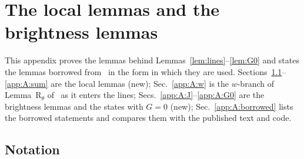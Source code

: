 \section{The local lemmas and the brightness lemmas}
\label{app:A}

This appendix proves the lemmas behind Lemmas~\ref{lem:lines}--\ref{lem:G0} and states the lemmas borrowed from~\cite{F,H} in the form in which they are used.
Sections~\ref{app:A:not}--\ref{app:A:sum} are the local lemmas (new); Sec.~\ref{app:A:w} is the $w$-branch of Lemma~R$_\theta$ of~\cite{H} as it enters the lines; Secs.~\ref{app:A:J}--\ref{app:A:G0} are the brightness lemmas and the states with $G=0$ (new); Sec.~\ref{app:A:borrowed} lists the borrowed statements and compares them with the published text and code.

\subsection{Notation}
\label{app:A:not}

